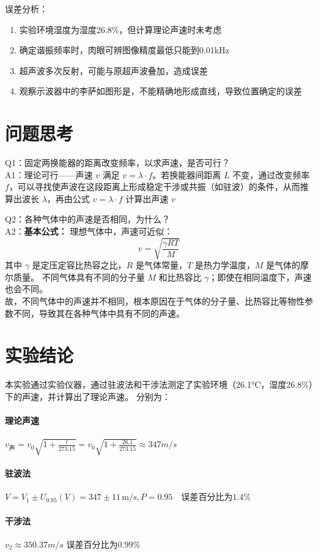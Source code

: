 \documentclass[12pt,a4paper]{article}
\begin{document}
		误差分析：
		\begin{enumerate}
			\item 实验环境湿度为湿度26.8\%，但计算理论声速时未考虑
			\item 确定谐振频率时，肉眼可辨图像精度最低只能到0.01kHz
			\item 超声波多次反射，可能与原超声波叠加，造成误差
			\item 观察示波器中的李萨如图形是，不能精确地形成直线，导致位置确定的误差
		\end{enumerate}

	\section{问题思考}
		Q1：固定两换能器的距离改变频率，以求声速，是否可行？\\
		A1：理论可行——声速 $v$ 满足 $v = \lambda \cdot f$。若换能器间距离 $L$ 不变，通过改变频率 $f$，可以寻找使声波在这段距离上形成稳定干涉或共振（如驻波）的条件，从而推算出波长 $\lambda$，再由公式 $v = \lambda \cdot f$ 计算出声速 $v$

		Q2：各种气体中的声速是否相同，为什么？\\
		A2：\textbf{基本公式：} 理想气体中，声速可近似：
		\[
		v = \sqrt{\frac{\gamma R T}{M}}
		\]
		其中 \(\gamma\) 是定压定容比热容之比，\(R\) 是气体常量，\(T\) 是热力学温度，\(M\) 是气体的摩尔质量。
		不同气体具有不同的分子量 \(M\) 和比热容比 \(\gamma\)；即使在相同温度下，声速也会不同。\\
		故，不同气体中的声速并不相同，根本原因在于气体的分子量、比热容比等物性参数不同，导致其在各种气体中具有不同的声速。
	
	\section{实验结论}
		本实验通过实验仪器，通过驻波法和干涉法测定了实验环境（26.1°C，湿度26.8\%）下的声速，并计算出了理论声速。
		分别为： 
		\paragraph{理论声速} $v_{声} = v_0 \sqrt{1+\frac{t}{273.15}} = v_0 \sqrt{1+\frac{26.1}{273.15}} \approx 347 m/s  $
		\paragraph{驻波法}	$V = V_1 \pm U_{0.95}(V) = 347 \pm 11 \, \text{m/s}, P = 0.95 \quad \text{误差百分比为}1.4\%$
		\paragraph{干涉法}	$v_{2} \approx 350.37 m/s$ \quad 误差百分比为0.99\%
\end{document}
